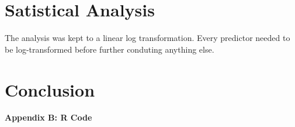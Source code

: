 \documentclass{article}
\begin{document}
\section{Satistical Analysis}
The analysis was kept to a linear log transformation. Every predictor needed to be log-transformed before further conduting anything else. 
\section{Conclusion}


\newpage
\noindent \Large{{\bf Appendix B: R Code}}


\end{document}
